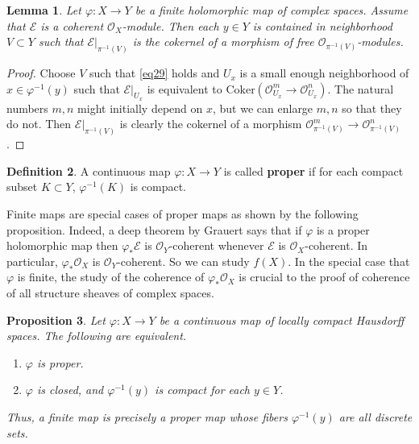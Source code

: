 \documentclass[12pt,b5paper,notitlepage]{report}
\theoremstyle{definition}
\newtheorem{df}{Definition}[section]
\theoremstyle{plain}
\newtheorem{pp}[df]{Proposition}
\newtheorem{lm}[df]{Lemma}
\newcommand{\scr}{\mathscr}
\newcommand{\Cok}{\mathrm{Coker}}
\numberwithin{equation}{section}
\begin{document}
\begin{lm}\label{lb87}
Let $\varphi:X\rightarrow Y$ be a finite holomorphic map of complex spaces. Assume that $\scr E$ is a coherent $\scr O_X$-module. Then each $y\in Y$ is contained in neighborhood $V\subset Y$ such that $\scr E|_{\pi^{-1}(V)}$ is the cokernel of a morphism of free $\scr O_{\pi^{-1}(V)}$-modules.
\end{lm}

\begin{proof}
Choose $V$ such that \eqref{eq29} holds and $U_x$ is a small enough neighborhood of $x\in\varphi^{-1}(y)$ such that $\scr E|_{U_x}$ is equivalent to $\Cok(\scr O_{U_x}^m\rightarrow\scr O_{U_x}^n)$. The natural numbers $m,n$ might initially depend on $x$, but we can enlarge $m,n$ so that they do not. Then $\scr E|_{\pi^{-1}(V)}$ is clearly the cokernel of a morphism $\scr O_{\pi^{-1}(V)}^m\rightarrow\scr O_{\pi^{-1}(V)}^n$.
\end{proof}







\begin{df}
A continuous map $\varphi:X\rightarrow Y$ is called \textbf{proper}  if for each compact subset $K\subset Y$, $\varphi^{-1}(K)$ is compact.
\end{df}

Finite maps are special cases of proper maps as shown by the following proposition. Indeed, a deep theorem by Grauert says that if $\varphi$ is a proper holomorphic map then $\varphi_*\scr E$ is $\scr O_Y$-coherent whenever $\scr E$ is $\scr O_X$-coherent. In particular, $\varphi_*\scr O_X$ is $\scr O_Y$-coherent. So we can study $f(X)$. In the special case that $\varphi$ is finite, the study of the coherence of $\varphi_*\scr O_X$ is crucial to the proof of coherence of all structure sheaves of complex spaces.


\begin{pp}\label{lb98}
Let $\varphi:X\rightarrow Y$ be a continuous map of locally compact Hausdorff spaces. The following are equivalent.
\begin{enumerate}[label=(\arabic*)]
\item $\varphi$ is proper.
\item $\varphi$ is closed, and $\varphi^{-1}(y)$ is compact for each $y\in Y$.
\end{enumerate}
Thus, a finite map is precisely a proper map whose fibers $\varphi^{-1}(y)$ are all discrete sets.
\end{pp}
\end{document}
